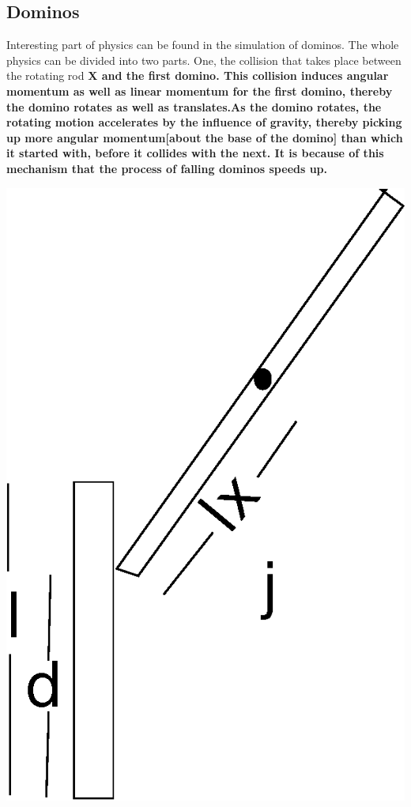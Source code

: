 \documentclass[11pt]{article}
\begin{document}
\subsection{Dominos}
Interesting part of physics can be found in the simulation of dominos. The whole physics can be divided into two parts. One, the collision that takes place between the rotating rod \bf X \rm and the first domino. This collision induces angular momentum as well as linear momentum for the first domino, thereby the domino rotates as well as translates.As the domino rotates, the rotating motion accelerates by the influence of gravity, thereby picking up more angular momentum[about the base of the domino] than which it started with, before it collides with the next. It is because of this mechanism that the process of falling dominos speeds up.\\
\centerline{\includegraphics[scale=0.2]{2}}\\
\end{document}
